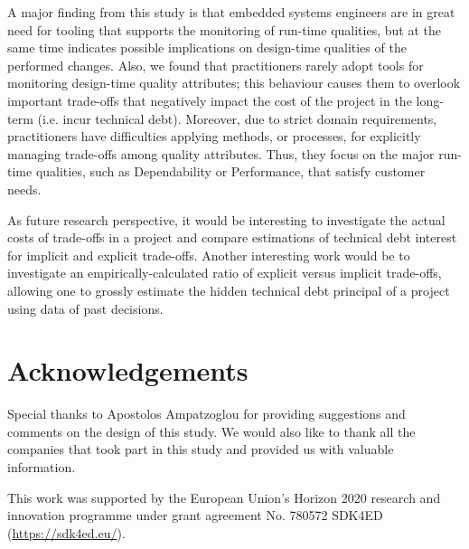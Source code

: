A major finding from this study is that embedded systems engineers are in great need for tooling that supports the monitoring of run-time qualities, but at the same time indicates possible implications on design-time qualities of the performed changes.
Also, we found that practitioners rarely adopt tools for monitoring design-time quality attributes; this behaviour causes them to overlook important trade-offs that negatively impact the cost of the project in the long-term (i.e. incur technical debt).
Moreover, due to strict domain requirements, practitioners have difficulties applying methods, or processes, for explicitly managing trade-offs among quality attributes. Thus, they focus on the major run-time qualities, such as Dependability or Performance, that satisfy customer needs.

As future research perspective, it would be interesting to investigate the actual costs of trade-offs in a project and compare estimations of technical debt interest for implicit and explicit trade-offs.
Another interesting work would be to investigate an empirically-calculated ratio of explicit versus implicit trade-offs, allowing one to grossly estimate the hidden technical debt principal of a project using data of past decisions.

\section*{Acknowledgements}
Special thanks to Apostolos Ampatzoglou for providing suggestions and comments on the design of this study.
We would also like to thank all the companies that took part in this study and provided us with valuable information.

This work was supported by the European Union's Horizon 2020 research and innovation programme under grant agreement No. 780572 SDK4ED (\url{https://sdk4ed.eu/}).